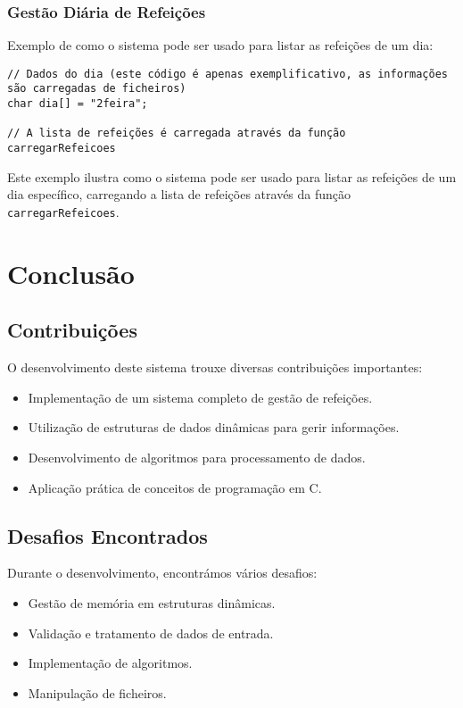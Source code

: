 \documentclass[a4paper,12pt]{report}
\begin{document}
\subsection{Gestão Diária de Refeições}
Exemplo de como o sistema pode ser usado para listar as refeições de um dia:

\begin{lstlisting}[caption={Exemplo de gestão diária de refeições},label=lst:exemplo_gestao_ref]
// Dados do dia (este código é apenas exemplificativo, as informações são carregadas de ficheiros)
char dia[] = "2feira";

// A lista de refeições é carregada através da função carregarRefeicoes
\end{lstlisting}
Este exemplo ilustra como o sistema pode ser usado para listar as refeições de um dia específico, carregando a lista de refeições através da função \texttt{carregarRefeicoes}.

\chapter{Conclusão}

\section{Contribuições}
O desenvolvimento deste sistema trouxe diversas contribuições importantes:
\begin{itemize}
    \item Implementação de um sistema completo de gestão de refeições.
    \item Utilização de estruturas de dados dinâmicas para gerir informações.
    \item Desenvolvimento de algoritmos para processamento de dados.
    \item Aplicação prática de conceitos de programação em C.
\end{itemize}

\section{Desafios Encontrados}
Durante o desenvolvimento, encontrámos vários desafios:
\begin{itemize}
    \item Gestão de memória em estruturas dinâmicas.
    \item Validação e tratamento de dados de entrada.
    \item Implementação de algoritmos.
    \item Manipulação de ficheiros.
\end{itemize}
\end{document}
